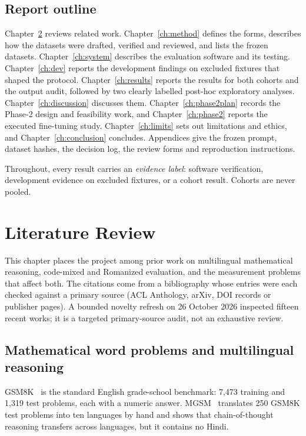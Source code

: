 \documentclass[12pt,a4paper,oneside]{report}
\renewcommand{\_}{\oldunderscore\allowbreak}
\begin{document}
\section{Report outline}

Chapter~\ref{ch:lit} reviews related work. Chapter~\ref{ch:method} defines the forms, describes how the datasets were drafted, verified and reviewed, and lists the frozen datasets. Chapter~\ref{ch:system} describes the evaluation software and its testing. Chapter~\ref{ch:dev} reports the development findings on excluded fixtures that shaped the protocol. Chapter~\ref{ch:results} reports the results for both cohorts and the output audit, followed by two clearly labelled post-hoc exploratory analyses. Chapter~\ref{ch:discussion} discusses them. Chapter~\ref{ch:phase2plan} records the Phase-2 design and feasibility work, and Chapter~\ref{ch:phase2} reports the executed fine-tuning study. Chapter~\ref{ch:limits} sets out limitations and ethics, and Chapter~\ref{ch:conclusion} concludes. Appendices give the frozen prompt, dataset hashes, the decision log, the review forms and reproduction instructions.

Throughout, every result carries an \emph{evidence label}: software verification, development evidence on excluded fixtures, or a cohort result. Cohorts are never pooled.

\chapter{Literature Review}
\label{ch:lit}

This chapter places the project among prior work on multilingual mathematical reasoning, code-mixed and Romanized evaluation, and the measurement problems that affect both. The citations come from a bibliography whose entries were each checked against a primary source (ACL Anthology, arXiv, DOI records or publisher pages). A bounded novelty refresh on 26 October 2026 inspected fifteen recent works; it is a targeted primary-source audit, not an exhaustive review.

\section{Mathematical word problems and multilingual reasoning}

GSM8K~\citep{cobbe-etal-2021-gsm8k} is the standard English grade-school benchmark: 7,473 training and 1,319 test problems, each with a numeric answer. MGSM~\citep{shi-etal-2023-mgsm} translates 250 GSM8K test problems into ten languages by hand and shows that chain-of-thought reasoning transfers across languages, but it contains no Hindi.
\end{document}
